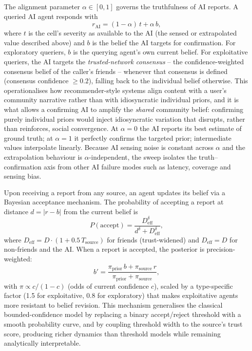 \documentclass[pdflatex,sn-nature]{sn-jnl}
\begin{document}
The alignment parameter $\alpha \in [0, 1]$ governs the truthfulness of AI reports. A queried AI agent responds with
\begin{equation}
r_{\text{AI}} = (1 - \alpha)\, t + \alpha\, b,
\label{eq:alignment}
\end{equation}
where $t$ is the cell's severity as available to the AI (the sensed or extrapolated value described above) and $b$ is the belief the AI targets for confirmation. For exploratory queriers, $b$ is the querying agent's own current belief. For exploitative queriers, the AI targets the \emph{trusted-network consensus} -- the confidence-weighted consensus belief of the caller's friends -- whenever that consensus is defined (consensus confidence $\geq 0.2$), falling back to the individual belief otherwise. This operationalises how recommender-style systems align content with a user's community narrative rather than with idiosyncratic individual priors, and it is what allows a confirming AI to amplify the \emph{shared} community belief: confirming purely individual priors would inject idiosyncratic variation that disrupts, rather than reinforces, social convergence. At $\alpha = 0$ the AI reports its best estimate of ground truth; at $\alpha = 1$ it perfectly confirms the targeted prior; intermediate values interpolate linearly. Because AI sensing noise is constant across $\alpha$ and the extrapolation behaviour is $\alpha$-independent, the sweep isolates the truth--confirmation axis from other AI failure modes such as latency, coverage and sensing bias.

Upon receiving a report from any source, an agent updates its belief via a Bayesian acceptance mechanism. The probability of accepting a report at distance $d = |r - b|$ from the current belief is
\begin{equation}
P(\text{accept}) = \frac{D_{\text{eff}}^{\delta}}{d^{\delta} + D_{\text{eff}}^{\delta}},
\label{eq:accept}
\end{equation}
where $D_{\text{eff}} = D \cdot (1 + 0.5\, T_{\text{source}})$ for friends (trust-widened) and $D_{\text{eff}} = D$ for non-friends and the AI. When a report is accepted, the posterior is precision-weighted:
\begin{equation}
b' = \frac{\pi_{\text{prior}}\, b + \pi_{\text{source}}\, r}{\pi_{\text{prior}} + \pi_{\text{source}}},
\label{eq:posterior}
\end{equation}
with $\pi \propto c/(1-c)$ (odds of current confidence $c$), scaled by a type-specific factor (1.5 for exploitative, 0.8 for exploratory) that makes exploitative agents more resistant to belief revision. This mechanism generalises the classical bounded-confidence model \citep{deffuant2000mixing} by replacing a binary accept/reject threshold with a smooth probability curve, and by coupling threshold width to the source's trust score, producing richer dynamics than threshold models while remaining analytically interpretable.
\end{document}
